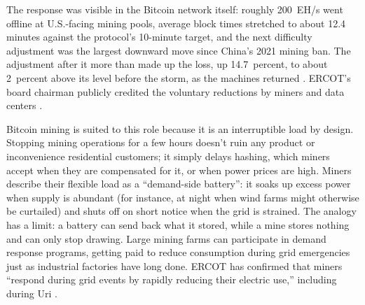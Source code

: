 The response was visible in the Bitcoin network itself: roughly 200~EH/s went offline at U.S.-facing mining pools, average block times stretched to about 12.4 minutes against the protocol's 10-minute target, and the next difficulty adjustment was the largest downward move since China's 2021 mining ban. The adjustment after it more than made up the loss, up 14.7~percent, to about 2~percent above its level before the storm, as the machines returned \autocite{TheBlockFern2026,TheBlockDifficulty2026,BraiinsInsights}. %
ERCOT's board chairman publicly credited the voluntary reductions by miners and data centers \autocite{FermanMalik2026}.

Bitcoin mining is suited to this role because it is an interruptible load by design. Stopping mining operations for a few hours doesn't ruin any product or inconvenience residential customers; it simply delays hashing, which miners accept when they are compensated for it, or when power prices are high. Miners describe their flexible load as a ``demand-side battery'': it soaks up excess power when supply is abundant (for instance, at night when wind farms might otherwise be curtailed) and shuts off on short notice when the grid is strained. The analogy has a limit: a battery can send back what it stored, while a mine stores nothing and can only stop drawing. Large mining farms can participate in demand response programs, getting paid to reduce consumption during grid emergencies just as industrial factories have long done. ERCOT has confirmed that miners ``respond during grid events by rapidly reducing their electric use,'' including during Uri \autocite{UtilityDiveBitcoin2022}.

